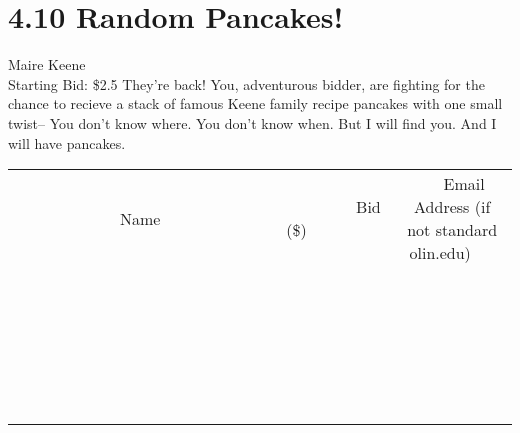 \documentclass[11pt]{article}
\begin{document}
\section*{4.10 Random Pancakes!}
Maire Keene
\\
Starting Bid: \$2.5
\newline
They're back! 
You, adventurous bidder, are fighting for the chance to recieve a stack of  famous Keene family recipe pancakes with one small twist--
You don't know where. 
You don't know when. 
But I will find you. 
And I will have pancakes.
\\[6ex]
\begin{tabular}{c c c}
~~~~~~~~~~~~~Name~~~~~~~~~~~~~ & ~~~~~~~~~Bid (\$)~~~~~~~~~  & ~~~Email Address (if not standard olin.edu)~~~\\
 & & \\
\hline
 & & \\
\hline
 & & \\
\hline
 & & \\
\hline
 & & \\
\hline
 & & \\
\hline
 & & \\
\hline
 & & \\
\hline
 & & \\
\hline
 & & \\
\hline
 & & \\
\hline
 & & \\
\hline
 & & \\
\hline
 & & \\
\hline
 & & \\
\hline
 & & \\
\hline
 & & \\
\hline
 & & \\
\hline
 & & \\
\hline
 & & \\
\hline
 & & \\
\hline
 & & \\
\hline
 & & \\
\hline
 & & \\
\hline
 & & \\
\hline
 & & \\
\hline
\end{tabular}
\newpage
\end{document}
